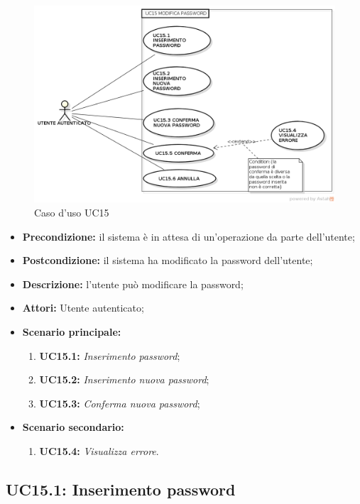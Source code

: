 \begin{figure}[h]
	\begin{center}
	\includegraphics[scale=0.4]{diagram/UC15.png}
	\caption{Caso d'uso UC15}
	\end{center}
\end{figure}
\begin{itemize}
	\item \textbf{Precondizione:} il sistema è in attesa di un'operazione da parte dell'utente;
	\item \textbf{Postcondizione:} il sistema ha modificato la password dell'utente;
	\item \textbf{Descrizione:} l'utente può modificare la password;
	\item \textbf{Attori:} Utente autenticato;
	\item \textbf{Scenario principale:}
	\begin{enumerate}
		\item \textbf{ UC15.1:} \textit{ Inserimento password};
		\item \textbf{ UC15.2:} \textit{ Inserimento nuova password};
		\item \textbf{ UC15.3:} \textit{ Conferma nuova password};
	\end{enumerate}
	\item \textbf{Scenario secondario:}
	\begin{enumerate}
		\item \textbf{ UC15.4:} \textit{ Visualizza errore}.
	\end{enumerate}
\end{itemize}
\subsection{ UC15.1: Inserimento password}

